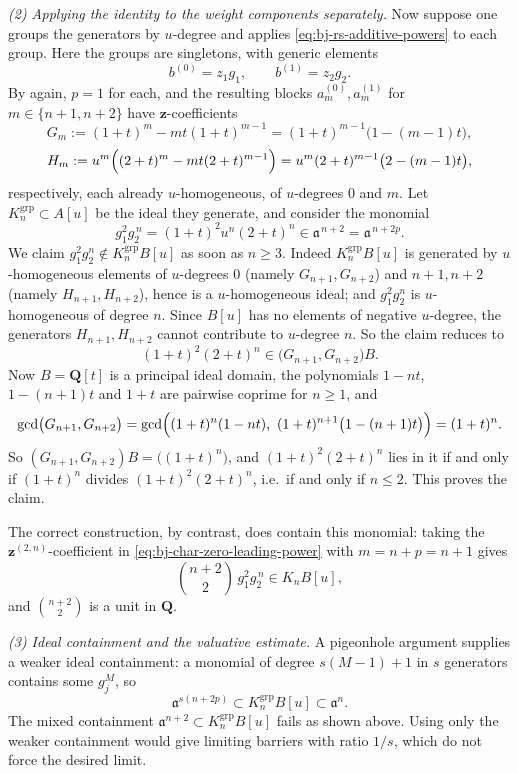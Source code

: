\begin{example}
\smallskip
\emph{(2) Applying the identity to the weight components separately.}
Now suppose one groups the generators by $u$-degree and applies
\eqref{eq:bj-rs-additive-powers} to each group.  Here the groups are
singletons, with generic elements
\[
 b^{(0)}=z_1g_1,
 \qquad
 b^{(1)}=z_2g_2 .
\]
By  again, $p=1$ for each, and the resulting blocks
$a^{(0)}_m,a^{(1)}_m$ for $m\in\{n+1,n+2\}$ have
$\mathbf z$-coefficients
\[
 G_m:=(1+t)^m-mt(1+t)^{m-1}=(1+t)^{m-1}\bigl(1-(m-1)t\bigr),
\]
\[
 H_m:=u^m\Bigl((2+t)^m-mt(2+t)^{m-1}\Bigr)
      =u^m(2+t)^{m-1}\bigl(2-(m-1)t\bigr),
\]
respectively, each already $u$-homogeneous, of $u$-degrees $0$ and
$m$.  Let $K_n^{\mathrm{grp}}\subset A[u]$ be the ideal they generate,
and consider the monomial
\[
 g_1^{2}g_2^{\,n}=(1+t)^2u^n(2+t)^n
 \in\mathfrak a^{\,n+2}=\mathfrak a^{\,n+2p}.
\]
We claim $g_1^2g_2^n\notin K_n^{\mathrm{grp}}B[u]$ as soon as $n\ge3$.
Indeed $K_n^{\mathrm{grp}}B[u]$ is generated by $u$-homogeneous elements
of $u$-degrees $0$ (namely $G_{n+1},G_{n+2}$) and $n+1,n+2$ (namely
$H_{n+1},H_{n+2}$), hence is a $u$-homogeneous ideal; and
$g_1^2g_2^n$ is $u$-homogeneous of degree $n$.  Since $B[u]$ has no
elements of negative $u$-degree, the generators $H_{n+1},H_{n+2}$ cannot
contribute to $u$-degree $n$.  So the claim reduces to
\[
 (1+t)^2(2+t)^n\in\bigl(G_{n+1},G_{n+2}\bigr)B .
\]
Now $B=\mathbf Q[t]$ is a principal ideal domain, the polynomials
$1-nt$, $1-(n+1)t$ and $1+t$ are pairwise coprime for $n\ge1$, and
\[
 \gcd\bigl(G_{n+1},G_{n+2}\bigr)
 =\gcd\Bigl((1+t)^n(1-nt),\ (1+t)^{n+1}\bigl(1-(n+1)t\bigr)\Bigr)
 =(1+t)^n .
\]
So $(G_{n+1},G_{n+2})B=\bigl((1+t)^n\bigr)$, and
$(1+t)^2(2+t)^n$ lies in it if and only if $(1+t)^n$ divides
$(1+t)^2(2+t)^n$, i.e.\ if and only if $n\le2$.  This proves the claim.

The correct construction, by contrast, does contain this monomial: taking
the $\mathbf z^{(2,n)}$-coefficient in
\eqref{eq:bj-char-zero-leading-power} with $m=n+p=n+1$ gives
\[
 \binom{n+2}{2}\,g_1^2g_2^{\,n}\in K_nB[u],
\]
and $\binom{n+2}2$ is a unit in $\mathbf Q$.

\smallskip
\emph{(3) Ideal containment and the valuative estimate.}
A pigeonhole argument supplies a weaker ideal containment: a monomial
of degree $s(M-1)+1$ in $s$ generators contains some $g_j^M$, so
\[
 \mathfrak a^{s(n+2p)}\subset K_n^{\mathrm{grp}}B[u]\subset\mathfrak a^n.
\]
The mixed containment $\mathfrak a^{n+2}\subset K_n^{\mathrm{grp}}B[u]$
fails as shown above.  Using only the weaker containment would give
limiting barriers with ratio $1/s$, which do not force the desired limit.


\end{example}
